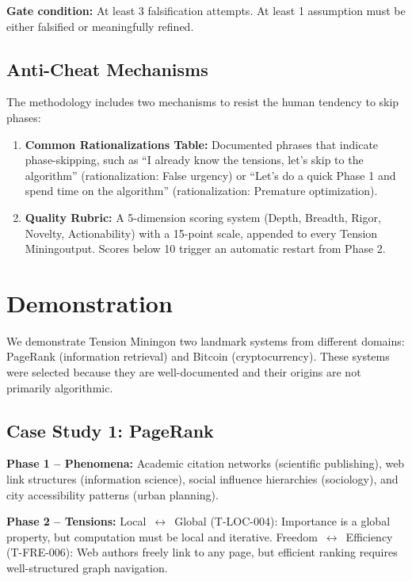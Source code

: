 \documentclass[11pt,a4paper]{article}
\newcommand{\methodname}{Tension Mining}
\begin{document}
\textbf{Gate condition:} At least 3 falsification attempts. At least 1 assumption must be either falsified or meaningfully refined.

\subsection{Anti-Cheat Mechanisms}

The methodology includes two mechanisms to resist the human tendency to skip phases:

\begin{enumerate}
  \item \textbf{Common Rationalizations Table:} Documented phrases that indicate phase-skipping, such as ``I already know the tensions, let's skip to the algorithm'' (rationalization: False urgency) or ``Let's do a quick Phase 1 and spend time on the algorithm'' (rationalization: Premature optimization).
  \item \textbf{Quality Rubric:} A 5-dimension scoring system (Depth, Breadth, Rigor, Novelty, Actionability) with a 15-point scale, appended to every \methodname output. Scores below 10 trigger an automatic restart from Phase 2.
\end{enumerate}

\section{Demonstration}
\label{sec:demonstration}

We demonstrate \methodname on two landmark systems from different domains: PageRank (information retrieval) and Bitcoin (cryptocurrency). These systems were selected because they are well-documented and their origins are not primarily algorithmic.

\subsection{Case Study 1: PageRank}

\textbf{Phase 1 -- Phenomena:} Academic citation networks (scientific publishing), web link structures (information science), social influence hierarchies (sociology), and city accessibility patterns (urban planning).

\textbf{Phase 2 -- Tensions:} Local~$\leftrightarrow$~Global (T-LOC-004): Importance is a global property, but computation must be local and iterative. Freedom~$\leftrightarrow$~Efficiency (T-FRE-006): Web authors freely link to any page, but efficient ranking requires well-structured graph navigation.
\end{document}
